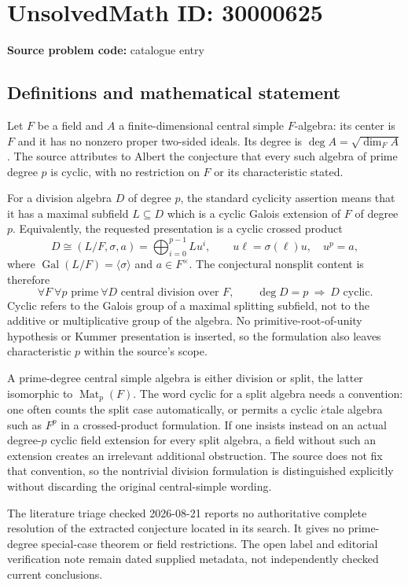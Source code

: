 \documentclass[11pt]{article}
\begin{document}
\section*{UnsolvedMath ID: 30000625}
\textbf{Source problem code:} catalogue entry
\subsection{Definitions and mathematical statement}
Let \(F\) be a field and \(A\) a finite-dimensional central simple \(F\)-algebra: its center is \(F\) and it has no nonzero proper two-sided ideals. Its degree is \(\deg A=\sqrt{\dim_F A}\). The source attributes to Albert the conjecture that every such algebra of prime degree \(p\) is cyclic, with no restriction on \(F\) or its characteristic stated.

For a division algebra \(D\) of degree \(p\), the standard cyclicity assertion means that it has a maximal subfield \(L\subseteq D\) which is a cyclic Galois extension of \(F\) of degree \(p\). Equivalently, the requested presentation is a cyclic crossed product
\[
 D\cong(L/F,\sigma,a)=\bigoplus_{i=0}^{p-1}Lu^i,
 \qquad u\ell=\sigma(\ell)u,\quad u^p=a,
\]
where \(\operatorname{Gal}(L/F)=\langle\sigma\rangle\) and \(a\in F^\times\). The conjectural nonsplit content is therefore
\[
 \forall F\ \forall p\text{ prime}\ \forall D\text{ central division over }F,
 \qquad \deg D=p\ \Longrightarrow\ D\text{ cyclic}.
\]
Cyclic refers to the Galois group of a maximal splitting subfield, not to the additive or multiplicative group of the algebra. No primitive-root-of-unity hypothesis or Kummer presentation is inserted, so the formulation also leaves characteristic \(p\) within the source's scope.

A prime-degree central simple algebra is either division or split, the latter isomorphic to \(\operatorname{Mat}_p(F)\). The word cyclic for a split algebra needs a convention: one often counts the split case automatically, or permits a cyclic \(\acute{e}\)tale algebra such as \(F^p\) in a crossed-product formulation. If one insists instead on an actual degree-\(p\) cyclic field extension for every split algebra, a field without such an extension creates an irrelevant additional obstruction. The source does not fix that convention, so the nontrivial division formulation is distinguished explicitly without discarding the original central-simple wording.

The literature triage checked 2026-08-21 reports no authoritative complete resolution of the extracted conjecture located in its search. It gives no prime-degree special-case theorem or field restrictions. The open label and editorial verification note remain dated supplied metadata, not independently checked current conclusions.
\end{document}
